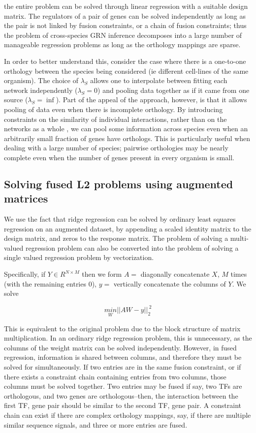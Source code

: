 \documentclass[11pt]{article}
\begin{document}
the entire problem can be solved through linear regression with a suitable design matrix. The regulators of a pair of genes can be solved independently as long as the pair is not linked by fusion constraints, or a chain of fusion constraints; thus the problem of cross-species GRN inference decomposes into a large number of manageable regression problems as long as the orthology mappings are sparse.

In order to better understand this, consider the case where there is a one-to-one orthology between the species being considered (ie different cell-lines of the same organism). The choice of $\lambda_S$ allows one to interpolate between fitting each network independently ($\lambda_S=0$) and pooling data together as if it came from one source ($\lambda_S=\inf$). Part of the appeal of the approach, however, is that it allows pooling of data even when there is incomplete orthology. By introducing constraints on the similarity of individual interactions, rather than on the networks as a whole \cite{liu2011temporal}, we can pool some information across species even when an arbitrarily small fraction of genes have orthologs. This is particularly useful when dealing with a large number of species; pairwise orthologies may be nearly complete even when the number of genes present in every organism is small. 

\subsection{Solving fused L2 problems using augmented matrices}
We use the fact that ridge regression can be solved by ordinary least squares regression on an augmented dataset, by appending a scaled identity matrix to the design matrix, and zeros to the response matrix. The problem of solving a multi-valued regression problem can also be converted into the problem of solving a single valued regression problem by vectorization. 

Specifically, if $Y \in R^{N \times M}$ then we form $A =$ diagonally concatenate $X$, $M$ times (with the remaining entries 0),
$y =$ vertically concatenate the columns of $Y$. We solve 

$$\underset{W}{min} ||AW - y||_2^{~2}$$

This is equivalent to the original problem due to the block structure of matrix multiplication. In an ordinary ridge regression problem, this is unnecessary, as the columns of the weight matrix can be solved independently. However, in fused regression, information is shared between columns, and therefore they must be solved for simultaneously. If two entries are in the same fusion constraint, or if there exists a constraint chain containing entries from two columns, those columns must be solved together. Two entries may be fused if say, two TFs are orthologous, and two genes are orthologous--then, the interaction between the first TF, gene pair should be similar to the second TF, gene pair. A constraint chain can exist if there are complex orthology mappings, say, if there are multiple similar sequence signals, and three or more entries are fused. 
\end{document}
